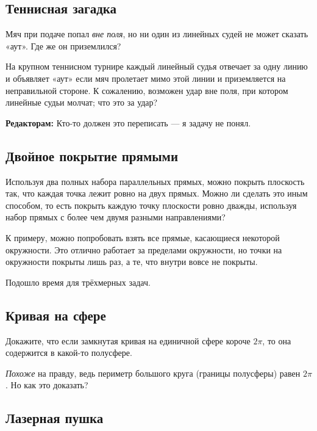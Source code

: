 \subsection*{Теннисная загадка}

Мяч при подаче попал \emph{вне поля}, но ни один из линейных судей не может сказать «аут».
Где же он приземлился?

На крупном теннисном турнире каждый линейный судья отвечает за одну линию и объявляет «аут» если мяч пролетает мимо этой линии и приземляется на неправильной стороне.
К сожалению, возможен удар вне поля, при котором линейные судьи молчат; что это за удар?

\begin{addedbytheeditors}
\textbf{Редакторам:} Кто-то должен это переписать --- я задачу не понял.
\end{addedbytheeditors}


\subsection*{Двойное покрытие прямыми}

Используя два полных набора параллельных прямых, можно покрыть плоскость так, что каждая точка лежит ровно на двух прямых.
Можно ли сделать это иным способом, то есть покрыть каждую точку плоскости ровно дважды, используя набор прямых с более чем двумя разными направлениями?

 К примеру, можно попробовать взять все прямые, касающиеся некоторой окружности.
Это отлично работает за пределами окружности, но точки на окружности покрыты лишь раз, а те, что внутри вовсе не покрыты.

\medskip

Подошло время для трёхмерных задач.

\subsection*{Кривая на сфере}

Докажите, что если замкнутая кривая на единичной сфере короче $2\pi$, то она содержится в какой-то полусфере.

 \emph{Похоже} на правду, ведь периметр большого круга (границы полусферы) равен $2\pi$.
Но как это доказать?

\subsection*{Лазерная пушка}

